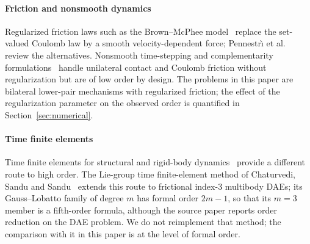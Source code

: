 \paragraph{Friction and nonsmooth dynamics}
Regularized friction laws such as the Brown--McPhee model~\cite{browmcphee2016friction} replace the
set-valued Coulomb law by a smooth velocity-dependent force; Pennestr\`{\i} et
al.~\cite{pennestri2016review} review the alternatives. Nonsmooth time-stepping and complementarity
formulations~\cite{stewart1996implicit,anitescu1997formulating,tasora2011matrixfree} handle
unilateral contact and Coulomb friction without regularization but are of low order by design. The
problems in this paper are bilateral lower-pair mechanisms with regularized friction; the effect of
the regularization parameter on the observed order is quantified in Section~\ref{sec:numerical}.

\paragraph{Time finite elements}
Time finite elements for structural and rigid-body dynamics~\cite{borri1988rigid,hughes1988spacetime,hulbert1992time,kim2017higher,jog2016robust,bauchau2024time}
provide a different route to high order. The Lie-group time finite-element method of Chaturvedi,
Sandu and Sandu~\cite{chaturvedi2026tfe} extends this route to frictional index-3 multibody DAEs;
its Gauss--Lobatto family of degree $m$ has formal order $2m-1$, so that its $m=3$ member is a
fifth-order formula, although the source paper reports order reduction on the DAE problem. We do
not reimplement that method; the comparison with it in this paper is at the level of formal order.
